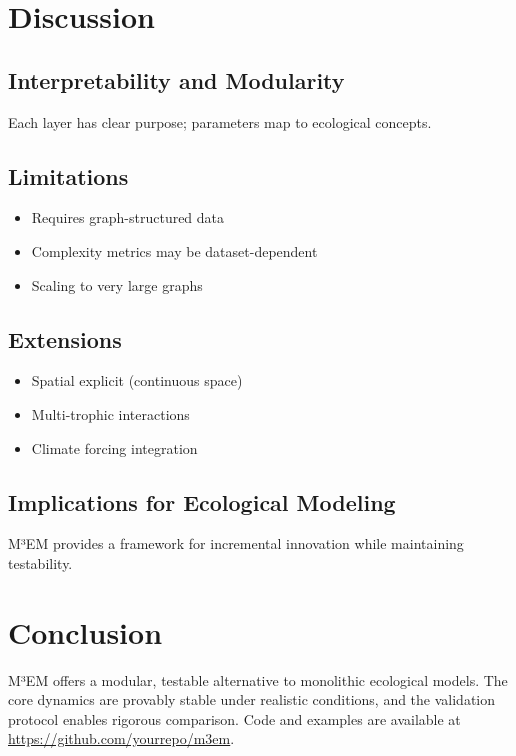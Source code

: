 \documentclass[12pt]{article}
\begin{document}
\section{Discussion}
\label{sec:discussion}

\subsection{Interpretability and Modularity}
Each layer has clear purpose; parameters map to ecological concepts.

\subsection{Limitations}
\begin{itemize}
    \item Requires graph-structured data
    \item Complexity metrics may be dataset-dependent
    \item Scaling to very large graphs
\end{itemize}

\subsection{Extensions}
\begin{itemize}
    \item Spatial explicit (continuous space)
    \item Multi-trophic interactions
    \item Climate forcing integration
\end{itemize}

\subsection{Implications for Ecological Modeling}
M³EM provides a framework for incremental innovation while maintaining testability.

\section{Conclusion}
\label{sec:conclusion}

M³EM offers a modular, testable alternative to monolithic ecological models. The core dynamics are provably stable under realistic conditions, and the validation protocol enables rigorous comparison. Code and examples are available at \url{https://github.com/yourrepo/m3em}.
\end{document}
